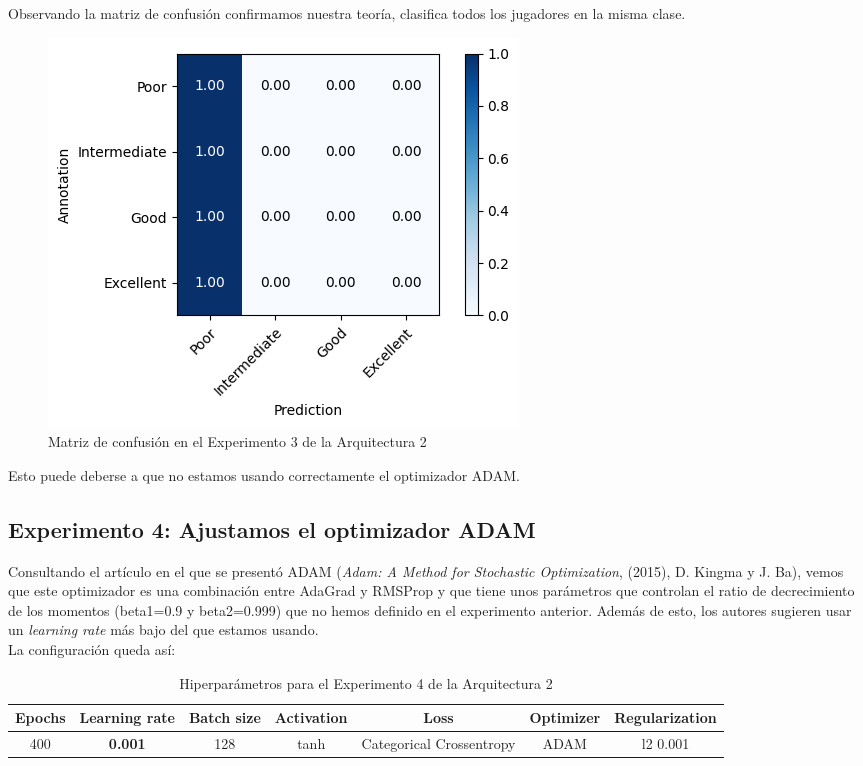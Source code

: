 \documentclass{article}
\begin{document}
			Observando la matriz de confusi\'on confirmamos nuestra teor\'ia, clasifica todos los jugadores en la misma clase.
			\begin{figure}[!h]
				\begin{center}
					\includegraphics[scale=0.7]{d-cm-a2-e3.png}		
					\caption{Matriz de confusi\'on en el Experimento 3 de la Arquitectura 2}	
					\label{d-cm-a2-e3}
				\end{center}
			\end{figure}
			
			Esto puede deberse a que no estamos usando correctamente el optimizador ADAM.
			
			
		\subsection{Experimento 4: Ajustamos el optimizador ADAM}
		\label{d-s-a2-e4}
			Consultando el art\'iculo en el que se present\'o ADAM (\textit{Adam: A Method for Stochastic Optimization}, (2015), D. Kingma y J. Ba), vemos que este optimizador es una combinaci\'on entre AdaGrad y RMSProp y que tiene unos par\'ametros que controlan el ratio de decrecimiento de los momentos (beta1=0.9 y beta2=0.999) que no hemos definido en el experimento anterior. Adem\'as de esto, los autores sugieren usar un \textit{learning rate} m\'as bajo del que estamos usando.\\
			
			La configuraci\'on queda as\'i:
			\begin{table}[!h]
				\begin{center}
					\begin{tabular}{| c | c | c | c | c | c | c |}
						\textbf{Epochs} & \textbf{Learning rate} & \textbf{Batch size} & \textbf{Activation} & \textbf{Loss} & \textbf{Optimizer} & \textbf{Regularization} \\ \hline
						400 & \textbf{0.001} & 128 & tanh & Categorical Crossentropy & ADAM & l2 0.001
					\end{tabular}
					\caption{Hiperpar\'ametros para el Experimento 4 de la Arquitectura 2}
					\label{tab:hip-d-a2-e4}
				\end{center}
			\end{table}
			
\end{document}

